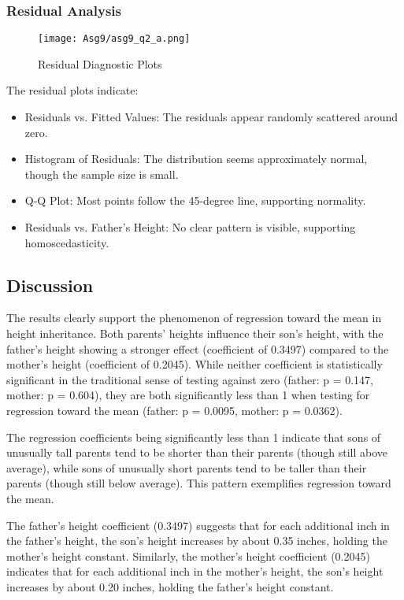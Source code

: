 \documentclass[12pt]{article}
\begin{document}
\subsubsection{Residual Analysis}
\begin{figure}[H]
    \centering
    \texttt{[image: Asg9/asg9\_q2\_a.png]}
    \caption{Residual Diagnostic Plots}
    \label{fig:enter-label}
\end{figure}
The residual plots indicate:
\begin{itemize}
    \item Residuals vs. Fitted Values: The residuals appear randomly scattered around zero.
    \item Histogram of Residuals: The distribution seems approximately normal, though the sample size is small.
    \item Q-Q Plot: Most points follow the 45-degree line, supporting normality.
    \item Residuals vs. Father's Height: No clear pattern is visible, supporting homoscedasticity.
\end{itemize}

\subsection{Discussion}
The results clearly support the phenomenon of regression toward the mean in height inheritance. Both parents' heights influence their son's height, with the father's height showing a stronger effect (coefficient of 0.3497) compared to the mother's height (coefficient of 0.2045). While neither coefficient is statistically significant in the traditional sense of testing against zero (father: p = 0.147, mother: p = 0.604), they are both significantly less than 1 when testing for regression toward the mean (father: p = 0.0095, mother: p = 0.0362).

The regression coefficients being significantly less than 1 indicate that sons of unusually tall parents tend to be shorter than their parents (though still above average), while sons of unusually short parents tend to be taller than their parents (though still below average). This pattern exemplifies regression toward the mean.

The father's height coefficient (0.3497) suggests that for each additional inch in the father's height, the son's height increases by about 0.35 inches, holding the mother's height constant. Similarly, the mother's height coefficient (0.2045) indicates that for each additional inch in the mother's height, the son's height increases by about 0.20 inches, holding the father's height constant.
\end{document}
